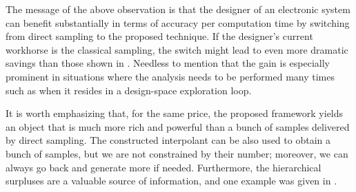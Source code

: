 The message of the above observation is that the designer of an electronic
system can benefit substantially in terms of accuracy per computation time by
switching from direct sampling to the proposed technique. If the designer's
current workhorse is the classical  sampling, the switch might lead to
even more dramatic savings than those shown in . Needless to
mention that the gain is especially prominent in situations where the analysis
needs to be performed many times such as when it resides in a design-space
exploration loop.

It is worth emphasizing that, for the same price, the proposed framework yields
an object that is much more rich and powerful than a bunch of samples delivered
by direct sampling. The constructed interpolant can be also used to obtain a
bunch of samples, but we are not constrained by their number; moreover, we can
always go back and generate more if needed. Furthermore, the hierarchical
surpluses are a valuable source of information, and one example was given in
.
